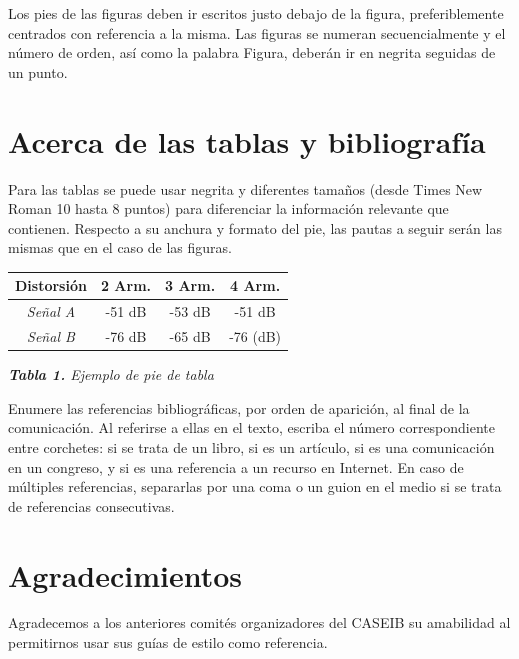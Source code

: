 \documentclass[a4paper,10pt,twocolumn]{article}
\begin{document}
Los pies de las figuras deben ir escritos justo debajo de la figura, preferiblemente centrados con referencia a la misma. Las figuras se numeran secuencialmente y el número de orden, así como la palabra Figura, deberán ir en negrita seguidas de un punto.

\section{Acerca de las tablas y bibliografía}
Para las tablas se puede usar negrita y diferentes tamaños (desde Times New Roman 10 hasta 8 puntos) para diferenciar la información relevante que contienen. Respecto a su anchura y formato del pie, las pautas a seguir serán las mismas que en el caso de las figuras.

\begin{center}
\begin{tabular}[hbt]{c c c c}
	\label{Tabla1}
	Distorsión & 2 Arm. & 3 Arm. & 4 Arm. \\
	\hline
	\hline
	\textit{Señal A} & -51 dB & -53 dB & -51 dB \\
	\textit{Señal B} &	-76 dB & -65 dB & -76 (dB) \\
	\hline
	\hline
\end{tabular}
\end{center}
\begin{center}
	\textit{\textbf{Tabla 1.} Ejemplo de pie de tabla}
\end{center}

Enumere las referencias bibliográficas, por orden de aparición, al final de la comunicación. Al referirse a ellas en el texto, escriba el número correspondiente entre corchetes: \cite{Bigio_2016} si se trata de un libro, \cite{Shariat_2024} si es un artículo, \cite{Romitti_2022} si es una comunicación en un congreso, y \cite{caseib_2024} si es una referencia a un recurso en Internet. En caso de múltiples referencias, separarlas por una coma \cite{Bigio_2016,Romitti_2022} o un guion en el medio \cite{Bigio_2016,Shariat_2024,Romitti_2022} si se trata de referencias consecutivas.

\section*{Agradecimientos}
Agradecemos a los anteriores comités organizadores del CASEIB su amabilidad al permitirnos usar sus guías de estilo como referencia.

\begin{small}


\end{small}
\end{document}
